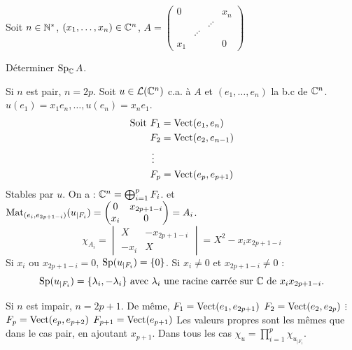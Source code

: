 
\begin{statementbox}
Soit $n \in \mathbb N^*$, $(x_1, \dots, x_n) \in \mathbb C^n$, $A = \begin{pmatrix} 0 & & & x_n \\ & & \iddots & \\ & \iddots & & \\ x_1 & & & 0 \end{pmatrix}$

Déterminer $\operatorname{Sp}_\mathbb C A$.
\end{statementbox}

\begin{solution}
Si $n$ est pair, $n = 2p$.
Soit $u \in \mathcal L(\mathbb C^n)$ c.a. à $A$ et $(e_1, \dots, e_n)$ la b.c de $\mathbb C^n$.
$u(e_1) = x_1 e_n, \dots, u(e_n) = x_n e_1$.
\begin{align*}
\text{Soit } & F_1 = \operatorname{Vect}(e_1, e_n) \\
& F_2 = \operatorname{Vect}(e_2, e_{n-1}) \\
& \vdots \\
& F_p = \operatorname{Vect}(e_p, e_{p+1})
\end{align*}
Stables par $u$.
On a : $\mathbb C^n = \bigoplus_{i=1}^p F_i$.
et $\operatorname{Mat}_{(e_i, e_{2p+1-i})}(u_{|F_i}) = \begin{pmatrix} 0 & x_{2p+1-i} \\ x_i & 0 \end{pmatrix} = A_i$.
\[
\chi_{A_i} = \begin{vmatrix} X & -x_{2p+1-i} \\ -x_i & X \end{vmatrix} = X^2 - x_i x_{2p+1-i}
\]
Si $x_i$ ou $x_{2p+1-i} = 0$, $\operatorname{Sp}(u_{|F_i}) = \{0\}$.
Si $x_i \neq 0$ et $x_{2p+1-i} \neq 0$ :
\[
\operatorname{Sp}(u_{|F_i}) = \{\lambda_i, -\lambda_i\} \text{ avec } \lambda_i \text{ une racine carrée sur } \mathbb C \text{ de } x_i x_{2p+1-i}.
\]

Si $n$ est impair, $n = 2p + 1$.
De même, $F_1 = \operatorname{Vect}(e_1, e_{2p+1})$
$F_2 = \operatorname{Vect}(e_2, e_{2p})$
$\vdots$
$F_p = \operatorname{Vect}(e_p, e_{p+2})$
$F_{p+1} = \operatorname{Vect}(e_{p+1})$
Les valeurs propres sont les mêmes que dans le cas pair, en ajoutant $x_{p+1}$.
Dans tous les cas $\chi_u = \prod_{i=1}^p \chi_{u_{|F_i}}$.
\end{solution}


